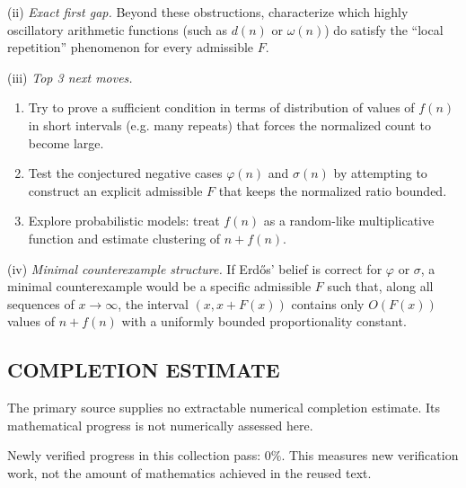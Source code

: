 (ii) \emph{Exact first gap.}
Beyond these obstructions, characterize which highly oscillatory arithmetic functions (such as $d(n)$ or $\omega(n)$) do satisfy the ``local repetition'' phenomenon for every admissible $F$.

(iii) \emph{Top 3 next moves.}
\begin{enumerate}
\item Try to prove a sufficient condition in terms of distribution of values of $f(n)$ in short intervals (e.g. many repeats) that forces the normalized count to become large.
\item Test the conjectured negative cases $\varphi(n)$ and $\sigma(n)$ by attempting to construct an explicit admissible $F$ that keeps the normalized ratio bounded.
\item Explore probabilistic models: treat $f(n)$ as a random-like multiplicative function and estimate clustering of $n+f(n)$.
\end{enumerate}

(iv) \emph{Minimal counterexample structure.}
If Erd\H{o}s' belief is correct for $\varphi$ or $\sigma$, a minimal counterexample would be a specific admissible $F$ such that, along all sequences of $x\to\infty$, the interval $(x,x+F(x))$ contains only $O(F(x))$ values of $n+f(n)$ with a uniformly bounded proportionality constant.


\subsection*{COMPLETION ESTIMATE}
The primary source supplies no extractable numerical completion estimate. Its mathematical progress is not numerically assessed here.

Newly verified progress in this collection pass: $0\%$. This measures new verification work, not the amount of mathematics achieved in the reused text.
